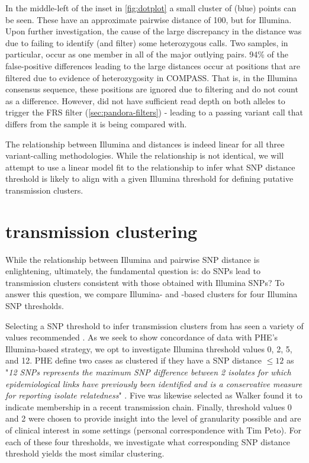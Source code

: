 In the middle-left of the inset in \autoref{fig:dotplot} a small cluster of \pandora{}  (blue) points can be seen. These have an approximate pairwise \ont{} distance of 100, but  for Illumina. Upon further investigation, the cause of the large discrepancy in the distance was due to \pandora{}  failing to identify (and filter) some heterozygous calls. Two samples, in particular, occur as one member in all of the major outlying pairs. 94\% of the false-positive differences leading to the large \ont{} distances occur at positions that are filtered due to evidence of heterozygosity in COMPASS. That is, in the Illumina consensus sequence, these positions are ignored due to filtering and do not count as a difference. However, \pandora{} did not have sufficient read depth on both alleles to trigger the FRS filter (\autoref{sec:pandora-filters}) - leading to a passing variant call that differs from the sample it is being compared with. 

\noindent
The relationship between Illumina and \ont{} distances is indeed linear for all three variant-calling methodologies. While the relationship is not identical, we will attempt to use a linear model fit to the relationship to infer what \ont{} SNP distance threshold is likely to align with a given Illumina threshold for defining putative transmission clusters.


\section{\ont{} transmission clustering}
\label{sec:clustering}

While the relationship between Illumina and \ont{} pairwise SNP distance is enlightening, ultimately, the fundamental question is: do \ont{} SNPs lead to transmission clusters consistent with those obtained with Illumina SNPs? To answer this question, we compare Illumina- and \ont{}-based clusters for four Illumina SNP thresholds. 

Selecting a SNP threshold to infer transmission clusters from has seen a variety of values recommended \cite{stimson2019}. As we seek to show concordance of \ont{} data with PHE's Illumina-based strategy, we opt to investigate Illumina threshold values 0, 2, 5, and 12. PHE define two cases as clustered if they have a SNP distance $\le 12$ as "\emph{12 SNPs represents the maximum SNP difference between 2 isolates for which epidemiological links have previously been identified \cite{walker2013} and is a conservative measure for reporting isolate relatedness}" \cite{phe-tb-england}. Five was likewise selected as Walker \etal{} \cite{walker2013} found it to indicate membership in a recent transmission chain. Finally, threshold values 0 and 2 were chosen to provide insight into the level of granularity possible and are of clinical interest in some settings (personal correspondence with Tim Peto). For each of these four thresholds, we investigate what corresponding \ont{} SNP distance threshold yields the most similar clustering.

